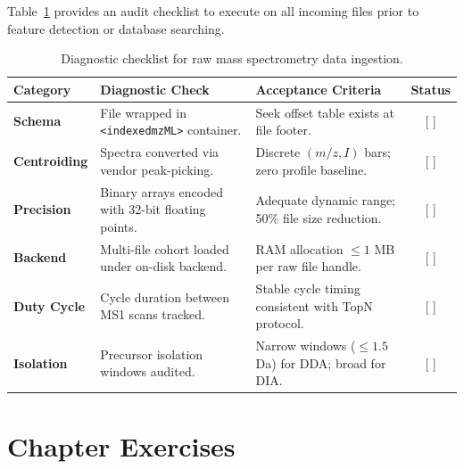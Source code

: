 \documentclass[11pt,twoside,openright]{book}
\begin{document}
Table~\ref{tab:ingestion_checklist} provides an audit checklist to execute on all incoming files prior to feature detection or database searching.

\begin{table}[htbp]
\centering
\caption{Diagnostic checklist for raw mass spectrometry data ingestion.}
\label{tab:ingestion_checklist}
\small
\begin{tabularx}{\textwidth}{>{\raggedright\arraybackslash}l >{\raggedright\arraybackslash}p{5.2cm} >{\raggedright\arraybackslash}X c}
\toprule
\textbf{Category} & \textbf{Diagnostic Check} & \textbf{Acceptance Criteria} & \textbf{Status} \\
\midrule
\textbf{Schema} & File wrapped in \texttt{<indexedmzML>} container. & Seek offset table exists at file footer. & [ ] \\
\addlinespace
\textbf{Centroiding} & Spectra converted via vendor peak-picking. & Discrete $(m/z, I)$ bars; zero profile baseline. & [ ] \\
\addlinespace
\textbf{Precision} & Binary arrays encoded with 32-bit floating points. & Adequate dynamic range; 50\% file size reduction. & [ ] \\
\addlinespace
\textbf{Backend} & Multi-file cohort loaded under on-disk backend. & RAM allocation $\le 1$ MB per raw file handle. & [ ] \\
\addlinespace
\textbf{Duty Cycle} & Cycle duration between MS1 scans tracked. & Stable cycle timing consistent with TopN protocol. & [ ] \\
\addlinespace
\textbf{Isolation} & Precursor isolation windows audited. & Narrow windows ($\le 1.5$ Da) for DDA; broad for DIA. & [ ] \\
\bottomrule
\end{tabularx}
\end{table}

\FloatBarrier

\section{Chapter Exercises}
\label{sec:chapter_exercises}
\end{document}
